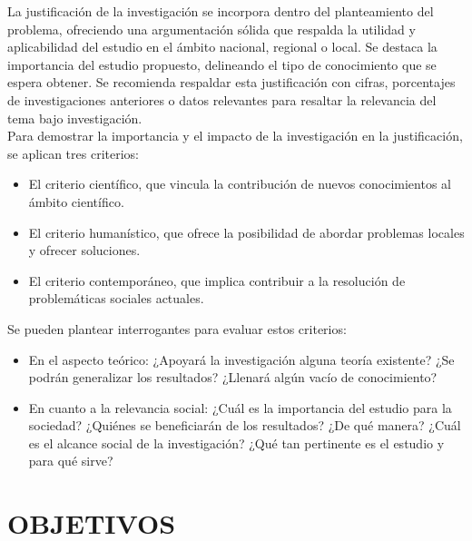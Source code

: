 \documentclass[12pt,a4paper,oneside]{report}
\begin{document}
La justificación de la investigación se incorpora dentro del planteamiento del problema, ofreciendo una argumentación sólida que respalda la utilidad y aplicabilidad del estudio en el ámbito nacional, regional o local. Se destaca la importancia del estudio propuesto, delineando el tipo de conocimiento que se espera obtener. Se recomienda respaldar esta justificación con cifras, porcentajes de investigaciones anteriores o datos relevantes para resaltar la relevancia del tema bajo investigación.\\

Para demostrar la importancia y el impacto de la investigación en la justificación, se aplican tres criterios:\\

\begin{itemize}
    \item El criterio científico, que vincula la contribución de nuevos conocimientos al ámbito científico.
    \item El criterio humanístico, que ofrece la posibilidad de abordar problemas locales y ofrecer soluciones.
    \item El criterio contemporáneo, que implica contribuir a la resolución de problemáticas sociales actuales.
\end{itemize}


Se pueden plantear interrogantes para evaluar estos criterios:\\

\begin{itemize}
    \item En el aspecto teórico: ¿Apoyará la investigación alguna teoría existente? ¿Se podrán generalizar los resultados? ¿Llenará algún vacío de conocimiento?
    \item En cuanto a la relevancia social: ¿Cuál es la importancia del estudio para la sociedad? ¿Quiénes se beneficiarán de los resultados? ¿De qué manera? ¿Cuál es el alcance social de la investigación? ¿Qué tan pertinente es el estudio y para qué sirve?
\end{itemize}






\chapter{OBJETIVOS}
\end{document}
